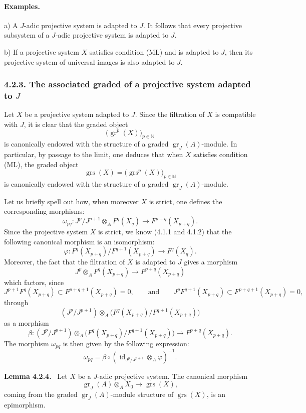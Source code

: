 \documentclass[11pt]{article}
\newenvironment{statement}[1]{\par\medskip\noindent\textbf{#1.}\ }{\par\medskip}
\providecommand{\gr}{\operatorname{gr}}
\providecommand{\id}{\operatorname{id}}
\providecommand{\id}{\operatorname{id}}
\providecommand{\gr}{\operatorname{gr}}
\providecommand{\gr}{\operatorname{gr}}
\providecommand{\grs}{\operatorname{grs}}
\providecommand{\id}{\operatorname{id}}
\providecommand{\id}{\operatorname{id}}
\providecommand{\id}{\operatorname{id}}
\providecommand{\id}{\operatorname{id}}
\begin{document}
\paragraph{Examples.}
a) A \(J\)-adic projective system is adapted to \(J\). It follows that every projective subsystem of a \(J\)-adic projective system is adapted to \(J\).

b) If a projective system \(X\) satisfies condition (ML) and is adapted to \(J\), then its projective system of universal images is also adapted to \(J\).

\subsubsection*{4.2.3. The associated graded of a projective system adapted to \(J\)}
Let \(X\) be a projective system adapted to \(J\). Since the filtration of \(X\) is compatible with \(J\), it is clear that the graded object
\[
\bigl(\gr^p(X)\bigr)_{p\in\mathbb N}
\]
is canonically endowed with the structure of a graded \(\gr_J(A)\)-module. In particular, by passage to the limit, one deduces that when \(X\) satisfies condition (ML), the graded object
\[
\grs(X)=\bigl(\grs^p(X)\bigr)_{p\in\mathbb N}
\]
is canonically endowed with the structure of a graded \(\gr_J(A)\)-module.

Let us briefly spell out how, when moreover \(X\) is strict, one defines the corresponding morphisms:
\[
\omega_{pq}: J^p/J^{p+1}\otimes_A F^q(X_q)\longrightarrow F^{p+q}(X_{p+q}).
\]
Since the projective system \(X\) is strict, we know (4.1.1 and 4.1.2) that the following canonical morphism is an isomorphism:
\[
\varphi:F^q(X_{p+q})/F^{q+1}(X_{p+q})\longrightarrow F^q(X_q).
\]
Moreover, the fact that the filtration of \(X\) is adapted to \(J\) gives a morphism
\[
J^p\otimes_A F^q(X_{p+q})\longrightarrow F^{p+q}(X_{p+q})
\]
which factors, since
\[
J^{p+1}F^q(X_{p+q})\subset F^{p+q+1}(X_{p+q})=0,\qquad\text{and}\qquad
J^pF^{q+1}(X_{p+q})\subset F^{p+q+1}(X_{p+q})=0,
\]
through
\[
(J^p/J^{p+1})\otimes_A
\bigl(F^q(X_{p+q})/F^{q+1}(X_{p+q})\bigr)
\]
as a morphism
\[
\beta:(J^p/J^{p+1})\otimes_A
\bigl(F^q(X_{p+q})/F^{q+1}(X_{p+q})\bigr)
\longrightarrow F^{p+q}(X_{p+q}).
\]
The morphism \(\omega_{pq}\) is then given by the following expression:
\[
\omega_{pq}=\beta\circ(\id_{J^p/J^{p+1}}\otimes_A\varphi)^{-1}.
\]

\begin{statement}{Lemma 4.2.4}
Let \(X\) be a \(J\)-adic projective system. The canonical morphism
\[
\gr_J(A)\otimes_A X_0\longrightarrow \grs(X),
\]
coming from the graded \(\gr_J(A)\)-module structure of \(\grs(X)\), is an epimorphism.
\end{statement}
\end{document}
